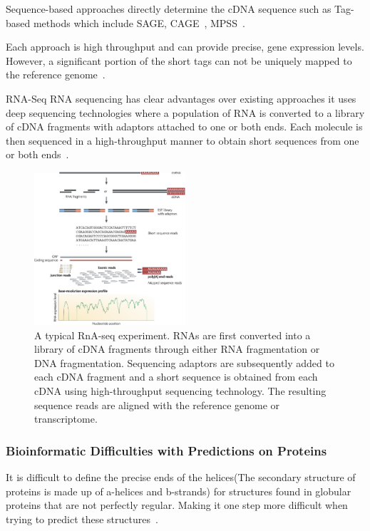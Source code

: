 \documentclass[]{final_report}
\begin{document}
Sequence-based approaches directly determine the cDNA sequence such as Tag-based methods which include SAGE, CAGE~\cite{kodzius_cage_2006}, MPSS~\cite{reinartz_massively_2002}.

Each approach is high throughput and can provide precise, gene expression levels. However, a significant portion of the short tags can not be uniquely mapped to the reference genome~\cite{wang_rna-seq_2009}.

RNA-Seq RNA sequencing has clear advantages over existing approaches it uses deep sequencing technologies where a population of RNA is converted to a library of cDNA fragments with adaptors attached to one or both ends. Each molecule is then sequenced in a high-throughput manner to obtain short sequences from one or both ends~\cite{wang_rna-seq_2009}.

\begin{figure}[ht]
    \centering
    \includegraphics[width=0.5\textwidth]{RNAseq.png}
    \caption{\label{fig:RNAseq}A typical RnA-seq experiment. RNAs are first converted into a library of cDNA fragments through either RNA fragmentation or DNA fragmentation. Sequencing adaptors are subsequently added to each cDNA fragment and a short sequence is obtained from each cDNA using high-throughput sequencing technology. The resulting sequence reads are aligned with the reference genome or transcriptome.}
\end{figure}

\subsubsection{Bioinformatic Difficulties with Predictions on Proteins}

It is difficult to define the precise ends of the helices(The secondary structure of proteins is made up of a-helices and b-strands) for structures found in globular proteins that are not perfectly regular. Making it one step more difficult when trying to predict these structures~\cite{zvelebil_understanding_2008}.
\end{document}
